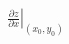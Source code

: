 \documentclass[preview]{standalone}
\begin{document}
\begin{align*}
\left.\frac{\partial z}{\partial x}\right|_{(x_0,y_0)}
\end{align*}
\end{document}
